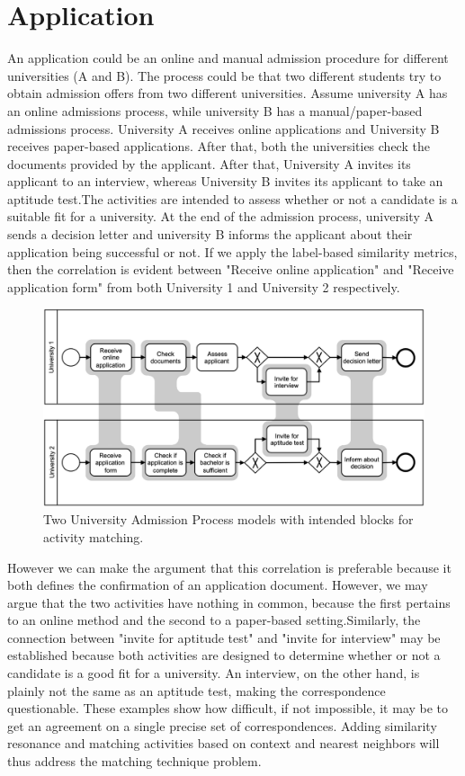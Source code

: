 \documentclass[runningheads]{llncs}
\begin{document}
\section{Application}
An application could be an online and manual admission procedure for different universities (A and B). The process could be that two different students try to obtain admission offers from two different universities. Assume university A has an online admissions process, while university B has a manual/paper-based admissions process. University A receives online applications and University B receives paper-based applications. After that, both the universities check the documents provided by the applicant. After that, University A invites its applicant to an interview, whereas University B invites its applicant to take an aptitude test.The activities are intended to assess whether or not a candidate is a suitable fit for a university. At the end of the admission process, university A sends a decision letter and university B informs the applicant about their application being successful or not. If we apply the label-based similarity metrics, then the correlation is evident between "Receive online application" and "Receive application form" from both University 1 and University 2 respectively.\newline
\begin{figure}
    \centering
    \includegraphics[width = \textwidth]{Figures/Fig_4.PNG}
    \caption{Two University Admission Process models with intended blocks for activity matching.\cite{ref5}}
    \label{fig:4}
\end{figure}
However we can make the argument that this correlation is preferable because it both defines the confirmation of an application document. However, we may argue that the two activities have nothing in common, because the first pertains to an online method and the second to a paper-based setting.Similarly, the connection between "invite for aptitude test" and "invite for interview" may be established because both activities are designed to determine whether or not a candidate is a good fit for a university. An interview, on the other hand, is plainly not the same as an aptitude test, making the correspondence questionable. These examples show how difficult, if not impossible, it may be to get an agreement on a single precise set of correspondences. Adding similarity resonance and matching activities based on context and nearest neighbors will thus address the matching technique problem.\newline
\end{document}
